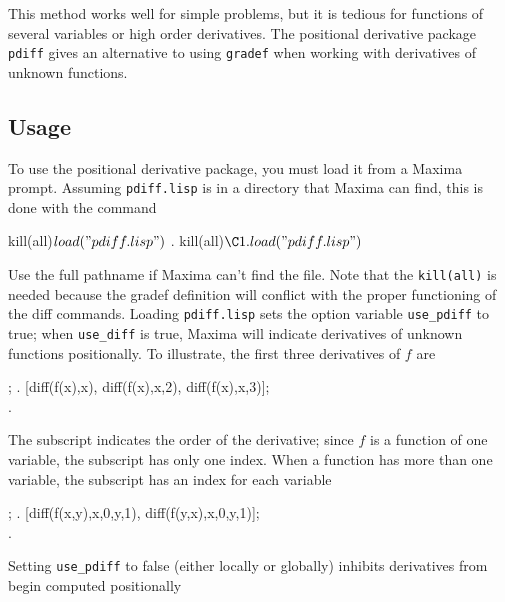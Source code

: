 This method works well for simple problems, but it 
is tedious for functions of several variables or high order
derivatives. The positional derivative package {\tt pdiff} gives 
an alternative to using {\tt gradef} when working with derivatives 
of unknown functions.

\subsection*{Usage}

To use the positional derivative package, you must load it from
a Maxima prompt.  Assuming {\tt pdiff.lisp} is in a directory that 
Maxima can find, this is done with the command

\beginmaximasession
kill(all)$
load("pdiff.lisp")$
\maximatexsession
{}.  kill(all)$ \\
\C1.  load("pdiff.lisp")$ \\
\endmaximasession

\noindent Use the full pathname if Maxima can't find the file. Note that
the {\tt kill(all)} is needed because the gradef definition will
conflict with the proper functioning of the diff commands. Loading 
{\tt pdiff.lisp} sets the option variable {\tt use\_pdiff} to true; 
when {\tt use\_diff} is true, Maxima will 
indicate derivatives of  unknown functions positionally. To illustrate, 
the first three  derivatives of $f$ are

;
\maximatexsession
{}.  [diff(f(x),x),
  diff(f(x),x,2),
  diff(f(x),x,3)]; \\
.   \\
\endmaximasession

The subscript indicates the order of the derivative;  since $f$ is a function of 
one variable, the subscript has only one index.  When a function has more 
than one variable, the subscript has an index for each variable

;
\maximatexsession
{}.  [diff(f(x,y),x,0,y,1), diff(f(y,x),x,0,y,1)]; \\
.   \\
\endmaximasession

\noindent Setting {\tt use\_pdiff} to false  (either locally or globally) inhibits derivatives from begin computed positionally


